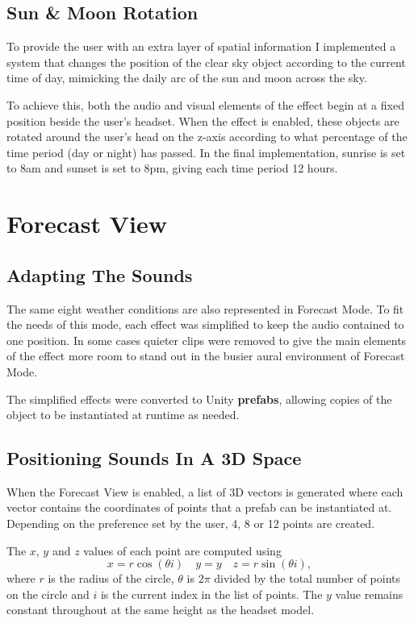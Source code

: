 \documentclass{l4proj}
\begin{document}
\subsection{Sun \& Moon Rotation}
To provide the user with an extra layer of spatial information I implemented a system that changes the position of the clear sky object according to the current time of day, mimicking the daily arc of the sun and moon across the sky.

To achieve this, both the audio and visual elements of the effect begin at a fixed position beside the user's headset. When the effect is enabled, these objects are rotated around the user's head on the z-axis according to what percentage of the time period (day or night) has passed. In the final implementation, sunrise is set to 8am and sunset is set to 8pm, giving each time period 12 hours.

\section{Forecast View}
\subsection{Adapting The Sounds}
The same eight weather conditions are also represented in Forecast Mode. To fit the needs of this mode, each effect was simplified to keep the audio contained to one position. In some cases quieter clips were removed to give the main elements of the effect more room to stand out in the busier aural environment of Forecast Mode.

The simplified effects were converted to Unity \textbf{prefabs}, allowing copies of the object to be instantiated at runtime as needed.

\subsection{Positioning Sounds In A 3D Space}

When the Forecast View is enabled, a list of 3D vectors is generated where each vector contains the coordinates of points that a prefab can be instantiated at. Depending on the preference set by the user, 4, 8 or 12 points are created.

The $x$, $y$ and $z$ values of each point are computed using
\begin{equation}
    x = r\cos(\theta{i})\quad y = y\quad z = r\sin(\theta{i}),
\end{equation}
where $r$ is the radius of the circle, $\theta$ is $2\pi$ divided by the total number of points on the circle and $i$ is the current index in the list of points. The $y$ value remains constant throughout at the same height as the headset model.
\end{document}
